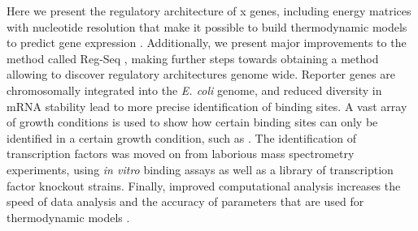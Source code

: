 Here we present the regulatory architecture of x  genes, including energy matrices with nucleotide resolution that make it possible to build thermodynamic models to predict gene expression \cite{kinney2010using,belliveau2018systematic,barnes2019mapping,ireland2020deciphering}. Additionally, we present major improvements to the method called Reg-Seq \cite{ireland2020deciphering}, making further steps towards obtaining a method allowing to discover regulatory architectures genome wide. Reporter genes are chromosomally integrated into the \textit{E. coli} genome, and reduced diversity in mRNA stability lead to more precise identification of binding sites. A vast array of growth conditions is used to show how certain binding sites can only be identified in a certain growth condition, such as . The identification of transcription factors was moved on from laborious mass spectrometry experiments, using \textit{in vitro} binding assays as well as a library of transcription factor knockout strains. Finally, improved computational analysis increases the speed of data analysis and the accuracy of parameters that are used for thermodynamic models .



